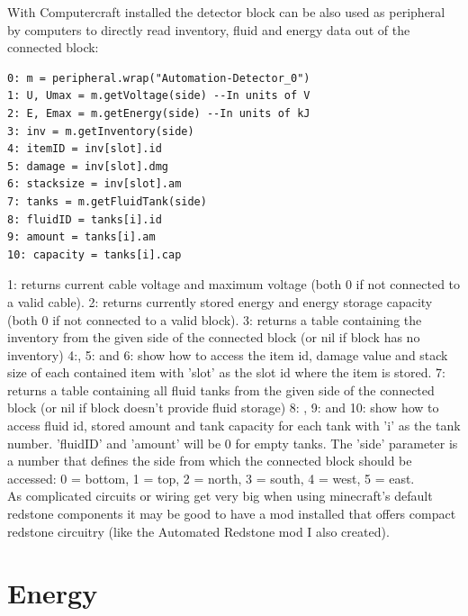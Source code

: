 \documentclass[11pt]{article} %
\begin{document}
With Computercraft installed the detector block can be also used as peripheral by computers to directly read inventory, fluid and energy data out of the connected block:
\begin{lstlisting}
0: m = peripheral.wrap("Automation-Detector_0")
1: U, Umax = m.getVoltage(side) --In units of V
2: E, Emax = m.getEnergy(side) --In units of kJ
3: inv = m.getInventory(side)
4: itemID = inv[slot].id
5: damage = inv[slot].dmg
6: stacksize = inv[slot].am
7: tanks = m.getFluidTank(side)
8: fluidID = tanks[i].id
9: amount = tanks[i].am
10: capacity = tanks[i].cap
\end{lstlisting}
1: returns current cable voltage and maximum voltage (both 0 if not connected to a valid cable). 2: returns currently stored energy and energy storage capacity (both 0 if not connected to a valid block). 3: returns a table containing the inventory from the given side of the connected block (or nil if block has no inventory) 4:, 5: and 6: show how to access the item id, damage value and stack size of each contained item with 'slot' as the slot id where the item is stored. 7: returns a table containing all fluid tanks from the given side of the connected block (or nil if block doesn't provide fluid storage) 8: , 9: and 10: show how to access fluid id, stored amount and tank capacity for each tank with 'i' as the tank number. 'fluidID' and 'amount' will be 0 for empty tanks. The 'side' parameter is a number that defines the side from which the connected block should be accessed: 0 = bottom, 1 = top, 2 = north, 3 = south, 4 = west, 5 = east.\\

As complicated circuits or wiring get very big when using minecraft's default redstone components it may be good to have a mod installed that offers compact redstone circuitry (like the Automated Redstone mod I also created).

\section{Energy}
\end{document}
